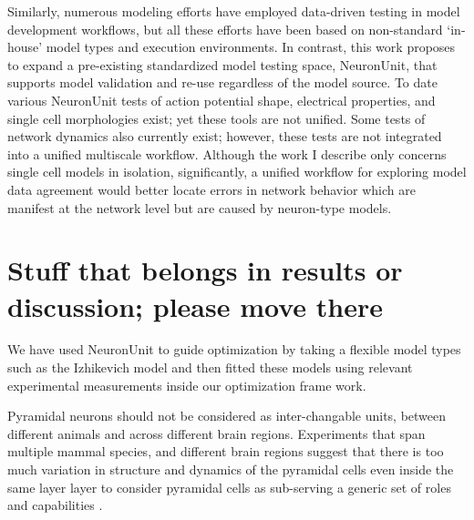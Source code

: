 Similarly, numerous modeling efforts have employed data-driven testing in model development workflows, but all these efforts have been based on non-standard ‘in-house’ model types and execution environments. In contrast, this work proposes to expand a pre-existing standardized model testing space, NeuronUnit, that supports model validation and re-use regardless of the model source. To date various NeuronUnit tests of action potential shape, electrical properties, and single cell morphologies exist; yet these tools are not unified. Some tests of network dynamics also currently exist; however, these tests are not integrated into a unified multiscale workflow. Although the work I describe only concerns single cell models in isolation, significantly, a unified workflow for exploring model data agreement would better locate errors in network behavior which are manifest at the network level but are caused by neuron-type models.

\section{Stuff that belongs in results or discussion; please move there}%
We have used NeuronUnit to guide optimization by taking a flexible model types such as the Izhikevich model and then fitted these models using relevant experimental measurements inside our optimization frame work.


Pyramidal neurons should not be considered as inter-changable units, between different animals and across different brain regions. Experiments that span multiple mammal species, and different brain regions suggest that there is too much variation in structure and dynamics of the pyramidal cells even inside the same layer layer to consider pyramidal cells as sub-serving a generic set of roles and capabilities \cite{luebke2017pyramidal}. %

